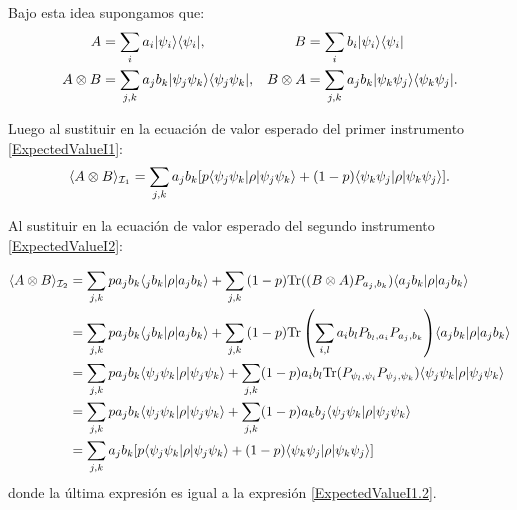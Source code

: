\documentclass[12pt,oneside]{book}\raggedbottom{}
\begin{document}
Bajo esta idea supongamos que: \begin{align}
    A&=\sum_i a_i |\psi_i\rangle \langle \psi_i|,& B&=\sum_i b_i |\psi_i\rangle \langle \psi_i|\\
    A\otimes B&= \sum_{j,k}a_j b_k |\psi_j\psi_k\rangle \langle\psi_j\psi_k|,&  B\otimes A&= \sum_{j,k}a_j b_k |\psi_k\psi_j\rangle \langle\psi_k\psi_j|.
\end{align}



Luego al sustituir en la ecuación de valor esperado del primer instrumento  {\ref{ExpectedValueI1}}:\begin{equation}\label{ExpectedValueI1.2}\langle A\otimes B\rangle_{\mathcal{I}_1}=\sum_{j,k}a_j b_k[p\langle \psi_j \psi_k|\rho |\psi_j \psi_k\rangle + (1-p)\langle \psi_k \psi_j|\rho | \psi_k \psi_j\rangle]. \end{equation}

Al sustituir en la ecuación de valor esperado del segundo instrumento {\ref{ExpectedValueI2}}:

\[\begin{split}
	\langle A\otimes B \rangle_{\mathcal{I}_2}&=\sum_{j,k}p a_{j}b_k  \langle_j b_k|\rho |a_j b_k\rangle+\sum_{j,k}{(1-p){\rm Tr}( (B\otimes A)P_{a_j,b_k})} \langle a_j b_k|\rho |a_j b_k\rangle \\
    &=\sum_{j,k}p a_{j}b_k  \langle_j b_k|\rho |a_j b_k\rangle+\sum_{j,k}{(1-p){\rm Tr}\left( \sum_{i,l}a_i b_l P_{b_l,a_i}P_{a_j,b_k}\right)} \langle a_j b_k|\rho |a_j b_k\rangle \\
    &=\sum_{j,k}p a_{j}b_k  \langle\psi_j \psi_k|\rho |\psi_j \psi_k\rangle+\sum_{j,k}(1-p) a_i b_l {\rm Tr}(P_{\psi_l,\psi_i}P_{\psi_j,\psi_k})\langle \psi_j \psi_k|\rho |\psi_j \psi_k\rangle \\
    &=\sum_{j,k}p a_{j}b_k  \langle\psi_j \psi_k|\rho |\psi_j \psi_k\rangle+\sum_{j,k}(1-p) a_k b_j \langle \psi_j \psi_k|\rho |\psi_j \psi_k\rangle \\
    &=\sum_{j,k} a_{j} b_k[p  \langle\psi_j \psi_k|\rho |\psi_j \psi_k\rangle+(1-p) \langle \psi_k\psi_j|\rho |\psi_k \psi_j\rangle] \\
\end{split}\]
 donde la última expresión es igual a la expresión  {\ref{ExpectedValueI1.2}}.
\end{document}
